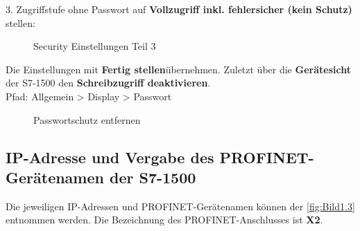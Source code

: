 \clearpage

3. Zugriffstufe ohne Passwort auf \textbf{Vollzugriff inkl. fehlersicher (kein Schutz)} stellen:
\begin{figure}[H]
   \centering
   \caption[Security Einstellungen Teil 3]{Security Einstellungen Teil 3}
   \label{fig:Bild3.9}
\end{figure}

Die Einstellungen mit \glqq\textbf{Fertig stellen}\grqq\:übernehmen. Zuletzt über die \textbf{Gerätesicht} der S7-1500 den \textbf{Schreibzugriff deaktivieren}.\\
Pfad: Allgemein > Display > Passwort 
\begin{figure}[H]
   \centering
   \caption[Passwortschutz entfernen]{Passwortschutz entfernen}
   \label{fig:Bild3.10}
\end{figure}

\clearpage

\subsection{IP-Adresse und Vergabe des PROFINET-Gerätenamen der S7-1500} \label{sec: IP-Adresse_PROFINET-Gerätename_S7-1500}
Die jeweiligen IP-Adressen und PROFINET-Gerätenamen können der \autoref{fig:Bild1.3} entnommen werden. Die Bezeichnung des PROFINET-Anschlusses ist \textbf{X2}.

